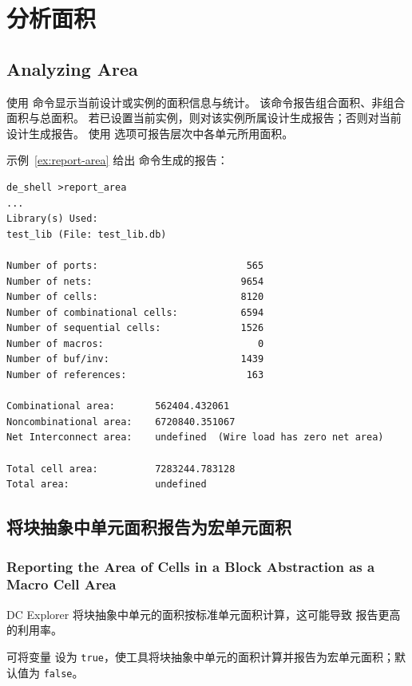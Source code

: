 \section{分析面积}
\subsection*{Analyzing Area}

使用  命令显示当前设计或实例的面积信息与统计。
该命令报告组合面积、非组合面积与总面积。
若已设置当前实例，则对该实例所属设计生成报告；否则对当前设计生成报告。
使用  选项可报告层次中各单元所用面积。

示例~\ref{ex:report-area} 给出  命令生成的报告：

\begin{lstlisting}[caption={report\_area 报告示例},label=ex:report-area]
de_shell >report_area
...
Library(s) Used:
test_lib (File: test_lib.db)

Number of ports:                          565
Number of nets:                          9654
Number of cells:                         8120
Number of combinational cells:           6594
Number of sequential cells:              1526
Number of macros:                           0
Number of buf/inv:                       1439
Number of references:                     163

Combinational area:       562404.432061
Noncombinational area:    6720840.351067
Net Interconnect area:    undefined  (Wire load has zero net area)

Total cell area:          7283244.783128
Total area:               undefined
\end{lstlisting}

\subsection{将块抽象中单元面积报告为宏单元面积}
\subsubsection*{Reporting the Area of Cells in a Block Abstraction as a Macro Cell Area}

DC Explorer 将块抽象中单元的面积按标准单元面积计算，这可能导致  报告更高的利用率。

可将变量  设为 \texttt{true}，使工具将块抽象中单元的面积计算并报告为宏单元面积；默认值为 \texttt{false}。

